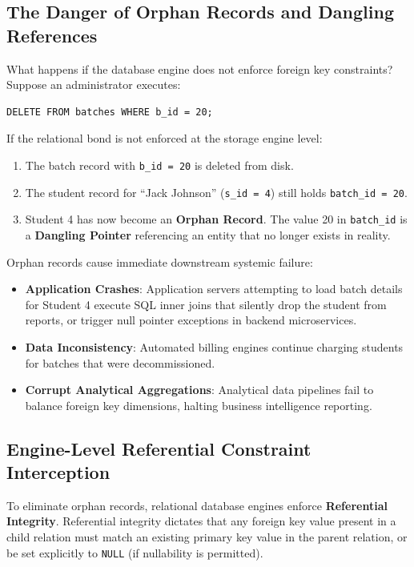 \documentclass[10pt,journal,compsoc,onecolumn]{IEEEtran}
\begin{document}
\subsection{The Danger of Orphan Records and Dangling References}
What happens if the database engine does not enforce foreign key constraints?
Suppose an administrator executes:
\begin{verbatim}
DELETE FROM batches WHERE b_id = 20;
\end{verbatim}
If the relational bond is not enforced at the storage engine level:
\begin{enumerate}
    \item The batch record with \texttt{b\_id = 20} is deleted from disk.
    \item The student record for ``Jack Johnson'' (\texttt{s\_id = 4}) still holds \texttt{batch\_id = 20}.
    \item Student 4 has now become an \textbf{Orphan Record}. The value 20 in \texttt{batch\_id} is a \textbf{Dangling Pointer} referencing an entity that no longer exists in reality.
\end{enumerate}

Orphan records cause immediate downstream systemic failure:
\begin{itemize}
    \item \textbf{Application Crashes}: Application servers attempting to load batch details for Student 4 execute SQL inner joins that silently drop the student from reports, or trigger null pointer exceptions in backend microservices.
    \item \textbf{Data Inconsistency}: Automated billing engines continue charging students for batches that were decommissioned.
    \item \textbf{Corrupt Analytical Aggregations}: Analytical data pipelines fail to balance foreign key dimensions, halting business intelligence reporting.
\end{itemize}

\subsection{Engine-Level Referential Constraint Interception}
To eliminate orphan records, relational database engines enforce \textbf{Referential Integrity}. Referential integrity dictates that any foreign key value present in a child relation must match an existing primary key value in the parent relation, or be set explicitly to \texttt{NULL} (if nullability is permitted).
\end{document}
